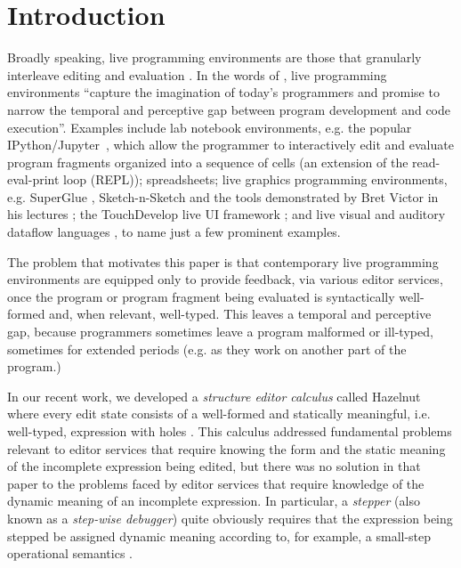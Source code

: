 \newcommand{\introSec}{Introduction}
\section{\protect\introSec}
\label{sec:intro}

Broadly speaking, live programming environments are those that granularly interleave editing and evaluation \cite{DBLP:conf/icse/Tanimoto13,DBLP:journals/vlc/Tanimoto90,McDirmid:2007:LUL:1297027.1297073,burckhardt2013s}. 
In the words of \citet{burckhardt2013s}, live programming environments 
``capture the imagination of today's programmers and promise to narrow the temporal and perceptive gap 
between program development and code execution''. Examples include {lab notebook environments},
e.g. the popular IPython/Jupyter~\cite{PER-GRA:2007}, which allow the
programmer to interactively edit and evaluate program fragments organized into a
sequence of cells (an extension of the read-eval-print loop (REPL)); spreadsheets; {live graphics programming environments}, e.g. SuperGlue \cite{McDirmid:2007:LUL:1297027.1297073}, Sketch-n-Sketch \cite{DBLP:conf/pldi/ChughHSA16} and the tools demonstrated by Bret Victor in his lectures \cite{victor2012inventing}; the TouchDevelop live UI framework \cite{Burckhardt:2013:ACF:2491956.2462170}; and live visual and auditory dataflow languages \cite{DBLP:conf/vl/BurnettAW98}, to name just a few prominent examples.


The problem that motivates this paper is that 
contemporary live programming environments are equipped only to provide feedback, via various editor services, once the program or 
program fragment being evaluated is syntactically well-formed and, when relevant, well-typed. This leaves a temporal and perceptive gap, because programmers sometimes leave a program malformed or ill-typed, sometimes for extended periods (e.g. as they work on another part of the program.)

In our recent work, we developed a \emph{structure editor calculus} called Hazelnut where every edit state consists of a well-formed and statically meaningful, i.e. well-typed, expression with holes \cite{popl-paper}. This calculus addressed fundamental problems relevant to editor services that require knowing the form and the static meaning of the incomplete expression being edited, but there was no solution in that paper to the problems faced by editor services that require knowledge of the dynamic meaning of an incomplete expression. In particular, a \emph{stepper} (also known as a \emph{step-wise debugger}) quite obviously requires that the expression being stepped be assigned dynamic meaning according to, for example, a small-step operational semantics \cite{citation}.





